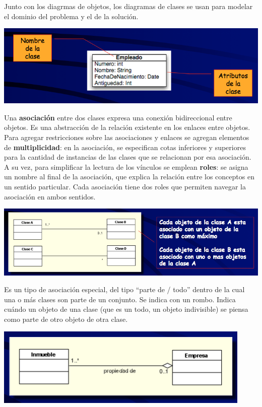 \documentclass[]{article}
\begin{document}
Junto con los diagrmas de objetos, los diagramas de clases se usan para modelar el dominio del problema y el de la solución.

\begin{center}
	\includegraphics[scale=0.5]{Conceptual.png}
\end{center}

Una \textbf{asociación} entre dos clases expresa una conexión bidireccional entre objetos. Es una abstracción de la relación existente en los enlaces entre objetos. Para agregar restricciones sobre las asociaciones y enlaces se agregan elementos de \textbf{multiplicidad}: en la asociación, se especifican cotas inferiores y superiores para la cantidad de instancias de las clases que se relacionan por esa asociación. A su vez, para simplificar la lectura de los vínculos se emplean \textbf{roles}: se asigna un nombre al final de la asociación, que explica la relación entre los conceptos en un sentido particular. Cada asociación tiene dos roles que permiten navegar la asociación en ambos sentidos.

\begin{center}
	\includegraphics[scale=0.5]{Asociacion.png}
\end{center}

Es un tipo de asociación especial, del tipo ``parte de / todo'' dentro de la cual una o más clases son parte de un conjunto. Se indica con un rombo. Indica cuándo un objeto de una clase (que es un todo, un objeto indivisible) se piensa como parte de otro objeto de otra clase.

\begin{center}
	\includegraphics[scale=0.6]{Agregacion.png}
\end{center}
\end{document}
